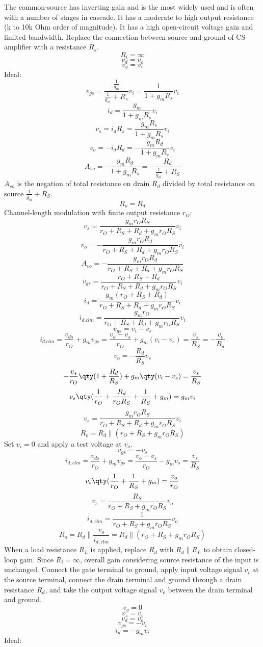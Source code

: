 \documentclass[a4paper,12pt]{report}
\begin{document}
The common-source has inverting gain and is the most widely used and is often with a number of stages in cascade. It has a moderate to high output resistance (k to 10k Ohm order of magnitude). It has a high open-circuit voltage gain and limited bandwidth.
Replace the connection between source and ground of CS amplifier with a resistance $R_s$.
\[R_i=\infty\]
\[v_d=v_o\]
\[v_g=v_i\]
\bit
\iten Ideal:
\[v_{gs}=\frac{\frac{1}{g_m}}{\frac{1}{g_m}+R_s}v_i=\frac{1}{1+g_mR_s}v_i\]
\[i_d=\frac{g_m}{1+g_mR_s}v_i\]
\[v_s=i_dR_s=\frac{g_mR_s}{1+g_mR_s}v_i\]
\[v_o=-i_dR_d=-\frac{g_mR_d}{1+g_mR_s}v_i\]
\[A_{vo}=-\frac{g_mR_d}{1+g_mR_s}=-\frac{R_d}{\frac{1}{g_m}+R_S}\]
$A_{vo}$ is the negation of total resistance on drain $R_d$ divided by total resistance on source $\frac{1}{g_m}+R_S$. 
\[R_o=R_d\]
\iten Channel-length modulation with finite output resistance $r_O$:
\[v_s=\frac{g_mr_OR_S}{r_O+R_S+R_d+g_mr_OR_S}v_i\]
\[v_o=-\frac{g_mr_OR_d}{r_O+R_S+R_d+g_mr_OR_S}v_i\]
\[A_{vo}=-\frac{g_mr_OR_d}{r_O+R_S+R_d+g_mr_OR_S}\]
\[v_{gs}=\frac{r_O+R_S+R_d}{r_O+R_S+R_d+g_mr_OR_S}v_i\]
\[i_d=\frac{g_m(r_O+R_S+R_d)}{r_O+R_S+R_d+g_mr_OR_S}v_i\]
\[i_{d.clm}=\frac{g_mr_O}{r_O+R_S+R_d+g_mr_OR_S}v_i\]
\bpr
\[v_{gs}=v_i-v_s\]
\[i_{d.clm}=\frac{v_{ds}}{r_O}+g_mv_{gs}=\frac{v_o-v_s}{r_O}+g_m(v_i-v_s)=\frac{v_s}{R_S}=-\frac{v_o}{R_d}\]
\[v_o=-\frac{R_d}{R_S}v_s\]
\[-\frac{v_s}{r_O}\qty(1+\frac{R_d}{R_S})+g_m\qty(v_i-v_s)=\frac{v_s}{R_S}\]
\[v_s\qty(\frac{1}{r_O}+\frac{R_d}{r_OR_S}+\frac{1}{R_S}+g_m)=g_mv_i\]
\[v_s=\frac{g_mr_OR_S}{r_O+R_S+R_d+g_mr_OR_S}v_i\]
\epr
\[R_o=R_d\parallel (r_O+R_S+g_mr_OR_S)\]
\bpr
Set $v_i=0$ and apply a test voltage at $v_o$.
\[v_{gs}=-v_s\]
\[i_{d,clm}=\frac{v_{ds}}{r_O}+g_mv_{gs}=\frac{v_o-v_s}{r_O}-g_mv_s=\frac{v_s}{R_S}\]
\[v_s\qty(\frac{1}{r_O}+\frac{1}{R_S}+g_m)=\frac{v_o}{r_O}\]
\[v_s=\frac{R_S}{r_O+R_S+g_mr_OR_S}v_o\]
\[i_{d,clm}=\frac{1}{r_O+R_S+g_mr_OR_S}v_o\]
\[R_o=R_d\parallel\frac{v_o}{i_{d,clm}}=R_d\parallel(r_O+R_S+g_mr_OR_S)\]
\epr
\eit
When a load resistance $R_L$ is applied, replace $R_d$ with $R_d\parallel R_L$ to obtain closed-loop gain. Since $R_i=\infty$, overall gain considering source resistance of the input is unchanged.
Connect the gate terminal to ground, apply input voltage signal $v_i$ at the source terminal, connect the drain terminal and ground through a drain resistance $R_d$, and take the output voltage signal $v_o$ between the drain terminal and ground.
\[v_g=0\]
\[v_s=v_i\]
\[v_d=v_o\]
\[v_{gs}=-v_i\]
\[i_d=-g_mv_i\]
\bit
\itm Ideal:
\end{document}
